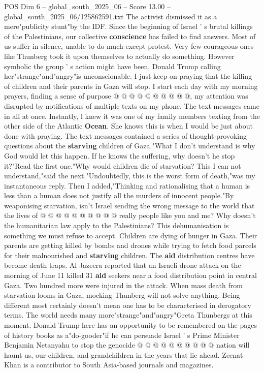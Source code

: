 \begin{textsample}{POS Dim 6 – global\_south\_2025\_06 – Score 13.00 – global\_south\_2025\_06/125862591.txt}
The activist dismissed it as a mere"publicity stunt"by the IDF.
Since the beginning of Israel ' s brutal killings of the Palestinians, our collective \textbf{conscience} has failed to find answers.
Most of us suffer in silence, unable to do much except protest.
Very few courageous ones like Thunberg took it upon themselves to actually do something.
However symbolic the group ' s action might have been, Donald Trump calling her"strange"and"angry"is unconscionable.
I just keep on praying that the killing of children and their parents in Gaza will stop.
I start each day with my morning prayers, finding a sense of purpose @ @ @ @ @ @ @ @ @ @, my attention was disrupted by notifications of multiple texts on my phone.
The text messages came in all at once.
Instantly, l knew it was one of my family members texting from the other side of the Atlantic \textbf{Ocean}.
She knows this is when I would be just about done with praying.
The text messages contained a series of thought-provoking questions about the \textbf{starving} children of Gaza."What I don't understand is why God would let this happen.
If he knows the suffering, why doesn't he stop it?"Read the first one."Why would children die of starvation?
This I can not understand,"said the next."Undoubtedly, this is the worst form of death,"was my instantaneous reply.
Then I added,"Thinking and rationalising that a human is less than a human does not justify all the murders of innocent people."By weaponising starvation, isn't Israel sending the wrong message to the world that the lives of @ @ @ @ @ @ @ @ @ @ really people like you and me?
Why doesn't the humanitarian law apply to the Palestinians?
This dehumanisation is something we must refuse to accept.
Children are dying of hunger in Gaza.
Their parents are getting killed by bombs and drones while trying to fetch food parcels for their malnourished and \textbf{starving} children.
The \textbf{aid} distribution centres have become death traps.
Al Jazeera reported that an Israeli drone attack on the morning of June 11 killed 31 \textbf{aid} seekers near a food distribution point in central Gaza.
Two hundred more were injured in the attack.
When mass death from starvation looms in Gaza, mocking Thunberg will not solve anything.
Being different most certainly doesn't mean one has to be characterised in derogatory terms.
The world needs many more"strange"and"angry"Greta Thunbergs at this moment.
Donald Trump here has an opportunity to be remembered on the pages of history books as a"do-gooder"if he can persuade Israel ' s Prime Minister Benjamin Netanyahu to stop the genocide @ @ @ @ @ @ @ @ @ @ nation will haunt us, our children, and grandchildren in the years that lie ahead.
Zeenat Khan is a contributor to South Asia-based journals and magazines.

\end{textsample}
